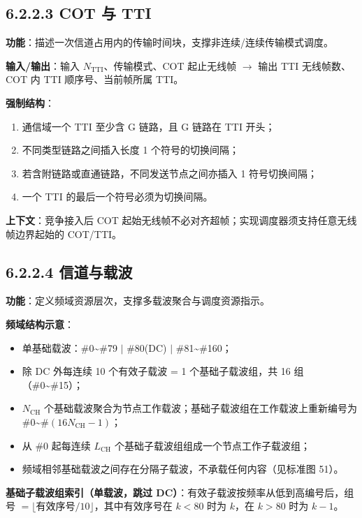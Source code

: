 \documentclass[11pt,a4paper]{ctexart}
\begin{document}
\subsection{6.2.2.3 COT 与 TTI}

\textbf{功能}：描述一次信道占用内的传输时间块，支撑非连续/连续传输模式调度。

\textbf{输入/输出}：输入 $N_{\mathrm{TTI}}$、传输模式、COT 起止无线帧 $\rightarrow$ 输出 TTI 无线帧数、COT 内 TTI 顺序号、当前帧所属 TTI。

\textbf{强制结构}：
\begin{enumerate}[nosep]
  \item 通信域一个 TTI 至少含 G 链路，且 G 链路在 TTI 开头；
  \item 不同类型链路之间插入长度 1 个符号的切换间隔；
  \item 若含附链路或直通链路，不同发送节点之间亦插入 1 符号切换间隔；
  \item 一个 TTI 的最后一个符号必须为切换间隔。
\end{enumerate}

\textbf{上下文}：竞争接入后 COT 起始无线帧不必对齐超帧；实现调度器须支持任意无线帧边界起始的 COT/TTI。

\subsection{6.2.2.4 信道与载波}

\textbf{功能}：定义频域资源层次，支撑多载波聚合与调度资源指示。

\textbf{频域结构示意}：
\begin{itemize}[nosep]
  \item 单基础载波：\#0\textasciitilde\#79 $|$ \#80(DC) $|$ \#81\textasciitilde\#160；
  \item 除 DC 外每连续 10 个有效子载波 = 1 个基础子载波组，共 16 组（\#0\textasciitilde\#15）；
  \item $N_{\mathrm{CH}}$ 个基础载波聚合为节点工作载波；基础子载波组在工作载波上重新编号为 \#0\textasciitilde\#$(16N_{\mathrm{CH}}-1)$；
  \item 从 \#0 起每连续 $L_{\mathrm{CH}}$ 个基础子载波组组成一个节点工作子载波组；
  \item 频域相邻基础载波之间存在分隔子载波，不承载任何内容（见标准图 51）。
\end{itemize}

\textbf{基础子载波组索引（单载波，跳过 DC）}：有效子载波按频率从低到高编号后，组号 $= \lfloor \mathrm{有效序号}/10 \rfloor$，其中有效序号在 $k{<}80$ 时为 $k$，在 $k{>}80$ 时为 $k-1$。
\end{document}
